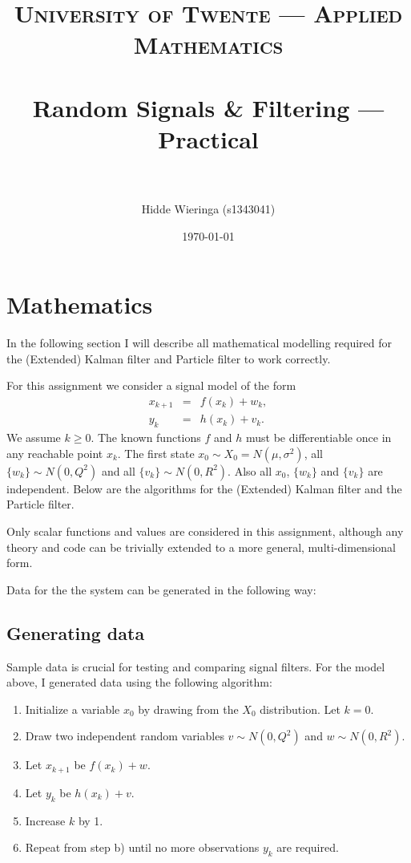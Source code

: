 \documentclass[paper=a4, fontsize=11pt]{scrartcl} %
\title{	
\normalfont \normalsize 
\textsc{University of Twente --- Applied Mathematics} \\ [25pt] %
\horrule{0.5pt} \\[0.4cm] %
\huge Random Signals \& Filtering --- Practical \\ %
\horrule{2pt} \\[0.5cm] %
}
\author{Hidde Wieringa (s1343041)} %
\date{\normalsize\today} %
\numberwithin{equation}{section} %
\numberwithin{figure}{section} %
\numberwithin{table}{section} %
\begin{document}
\maketitle %

\newpage 
\section{Mathematics}

In the following section I will describe all mathematical modelling required for the (Extended) Kalman filter and Particle filter to work correctly. 

For this assignment we consider a signal model of the form 
\begin{eqnarray}\label{eq:2}
	x_{k+1} &=& f(x_k) + w_k,\\
	y_{k} &=& h(x_k) + v_k.
\end{eqnarray}
We assume $k \geq 0$. The known functions $f$ and $h$ must be differentiable once in any reachable point $x_k$. The first state $x_0 \sim X_0 =N(\mu, \sigma^2)$, all $\{w_k\} \sim N(0,Q^2)$ and all $\{v_k\} \sim N(0,R^2)$. Also all $x_0$, $\{w_k\}$ and $\{v_k\}$ are independent. Below are the algorithms for the (Extended) Kalman filter and the Particle filter. 

Only scalar functions and values are considered in this assignment, although any theory and code can be trivially extended to a more general, multi-dimensional form.

Data for the the system can be generated in the following way:
		
\subsection{Generating data}

Sample data is crucial for testing and comparing signal filters. For the model above, I generated data using the following algorithm:
\begin{enumerate}
	\item Initialize a variable $x_0$ by drawing from the $X_0$ distribution. Let $k=0$. 
	\item Draw two independent random variables $v\sim N(0,Q^2)$ and $w\sim N(0,R^2)$.
	\item Let $x_{k+1}$ be $f(x_{k})+w$.
	\item Let $y_{k}$ be $h(x_{k})+v$.
	\item Increase $k$ by 1.
	\item Repeat from step b) until no more observations $y_k$ are required.
\end{enumerate}
\end{document}
